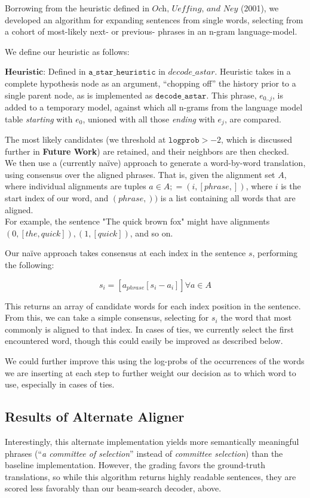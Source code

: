 \documentclass[a4paper]{article}
\begin{document}
Borrowing from the heuristic defined in $\textit{Och, Ueffing, and Ney}$ (2001), we developed an algorithm for expanding sentences from single words, selecting from a cohort of most-likely next- or previous- phrases in an n-gram language-model.

We define our heuristic as follows:

$\textbf{Heuristic}$: Defined in $\texttt{a\_star\_heuristic}$ in $decode\_astar$. Heuristic takes in a complete hypothesis node as an argument, ``chopping off'' the history prior to a single parent node, as is implemented as $\texttt{decode\_astar}$. This phrase, $e_{0..j}$, is added to a temporary model, against which all n-grams from the language model table \textit{starting} with $e_{0}$, unioned with all those \textit{ending} with $e_{j}$, are compared.

The most likely candidates (we threshold at $\mathtt{logprob} > -2$, which is discussed further in \textbf{Future Work}) are retained, and their neighbors are then checked. \\

We then use a (currently naïve) approach to generate a word-by-word translation, using consensus over the aligned phrases. That is, given the alignment set $A$, where individual alignments are tuples $a \in A; = (i, [phrase, ])$, where $i$ is the start index of our word, and $(phrase, ))$ is a list containing all words that are aligned. \\

For example, the sentence "The quick brown fox" might have alignments $(0, [the, quick]), (1, [quick])$, and so on.

Our naïve approach takes consensus at each index in the sentence $s$, performing the following:

$$\displaystyle s_i = [a_{phrase}[s_i - a_i]] \forall a \in A$$

This returns an array of candidate words for each index position in the sentence. From this, we can take a simple consensus, selecting for $s_i$ the word that most commonly is aligned to that index. In cases of ties, we currently select the first encountered word, though this could easily be improved as described below.

We could further improve this using the log-probs of the occurrences of the words we are inserting at each step to further weight our decision as to which word to use, especially in cases of ties.

\subsection{Results of Alternate Aligner}
Interestingly, this alternate implementation yields more semantically meaningful phrases (``\textit{a committee of selection}'' instead of \textit{committee selection}) than the baseline implementation. However, the grading favors the ground-truth translations, so while this algorithm returns highly readable sentences, they are scored less favorably than our beam-search decoder, above.
\end{document}
